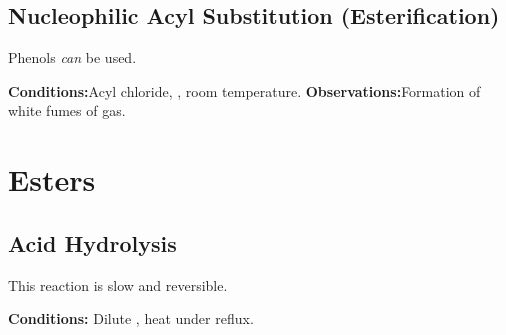 


		\subsection{Nucleophilic Acyl Substitution (Esterification)}

			Phenols \textit{can} be used.

			\vspace{1.5em}
			\vbox{\textbf{Conditions:}\tabto{35mm}Acyl chloride, , room temperature.}
			\vbox{\textbf{Observations:}\tabto{35mm}Formation of white fumes of  gas.}










	\pagebreak
	\section{Esters}

		\subsection{Acid Hydrolysis}

			This reaction is slow and reversible.

			\vspace{1.5em}
			\vbox{\textbf{Conditions:}	\tabto{35mm}Dilute , heat under reflux.}


